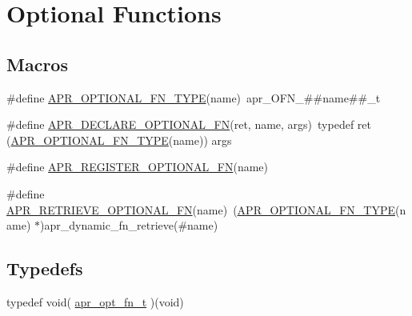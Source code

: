 \hypertarget{group___a_p_r___util___opt}{\section{Optional Functions}
\label{group___a_p_r___util___opt}
}
\subsection*{Macros}
\begin{DoxyCompactItemize}
\item 
\#define \hyperlink{group___a_p_r___util___opt_ga987fcf75505450f1b4ff9d7b3a7ff5d3}{A\-P\-R\-\_\-\-O\-P\-T\-I\-O\-N\-A\-L\-\_\-\-F\-N\-\_\-\-T\-Y\-P\-E}(name)~apr\-\_\-\-O\-F\-N\-\_\-\#\#name\#\#\-\_\-t
\item 
\#define \hyperlink{group___a_p_r___util___opt_gaf3ff372e28978d4ce0be7517ca2fddbd}{A\-P\-R\-\_\-\-D\-E\-C\-L\-A\-R\-E\-\_\-\-O\-P\-T\-I\-O\-N\-A\-L\-\_\-\-F\-N}(ret, name, args)~typedef ret (\hyperlink{group___a_p_r___util___opt_ga987fcf75505450f1b4ff9d7b3a7ff5d3}{A\-P\-R\-\_\-\-O\-P\-T\-I\-O\-N\-A\-L\-\_\-\-F\-N\-\_\-\-T\-Y\-P\-E}(name)) args
\item 
\#define \hyperlink{group___a_p_r___util___opt_gab611deabd6e78b5f666071e8cbdcc736}{A\-P\-R\-\_\-\-R\-E\-G\-I\-S\-T\-E\-R\-\_\-\-O\-P\-T\-I\-O\-N\-A\-L\-\_\-\-F\-N}(name)
\item 
\#define \hyperlink{group___a_p_r___util___opt_ga35f2df25ca06248d2fdd3e7463446418}{A\-P\-R\-\_\-\-R\-E\-T\-R\-I\-E\-V\-E\-\_\-\-O\-P\-T\-I\-O\-N\-A\-L\-\_\-\-F\-N}(name)~(\hyperlink{group___a_p_r___util___opt_ga987fcf75505450f1b4ff9d7b3a7ff5d3}{A\-P\-R\-\_\-\-O\-P\-T\-I\-O\-N\-A\-L\-\_\-\-F\-N\-\_\-\-T\-Y\-P\-E}(name) $\ast$)apr\-\_\-dynamic\-\_\-fn\-\_\-retrieve(\#name)
\end{DoxyCompactItemize}
\subsection*{Typedefs}
\begin{DoxyCompactItemize}
\item 
typedef void( \hyperlink{group___a_p_r___util___opt_ga35e08c2dbf593e3dc5a2cb0fdc8cd637}{apr\-\_\-opt\-\_\-fn\-\_\-t} )(void)
\end{DoxyCompactItemize}
